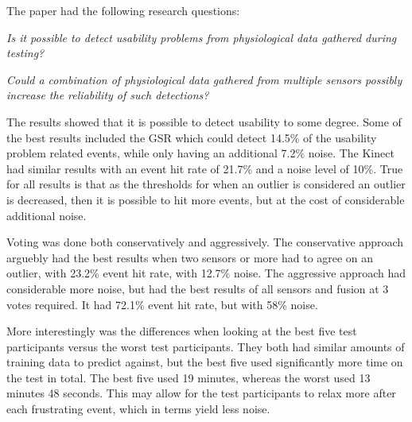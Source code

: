 The paper had the following research questions:

\textit{Is it possible to detect usability problems from physiological data gathered during testing?}

\textit{Could a combination of physiological data gathered from multiple sensors possibly increase the reliability of such detections?}

The results showed that it is possible to detect usability to some degree. 
Some of the best results included the GSR which could detect 14.5\% of the usability problem related events, while only having an additional 7.2\% noise. 
The Kinect had similar results with an event hit rate of 21.7\% and a noise level of 10\%. 
True for all results is that as the thresholds for when an outlier is considered an outlier is decreased, then it is possible to hit more events, but at the cost of considerable additional noise.

Voting was done both conservatively and aggressively.
The conservative approach arguebly had the best results when two sensors or more had to agree on an outlier, with 23.2\% event hit rate, with 12.7\% noise.
The aggressive approach had considerable more noise, but had the best results of all sensors and fusion at 3 votes required.
It had 72.1\% event hit rate, but with 58\% noise.

More interestingly was the differences when looking at the best five test participants versus the worst test participants. 
They both had similar amounts of training data to predict against, but the best five used significantly more time on the test in total.
The best five used 19 minutes, whereas the worst used 13 minutes 48 seconds. 
This may allow for the test participants to relax more after each frustrating event, which in terms yield less noise. 
